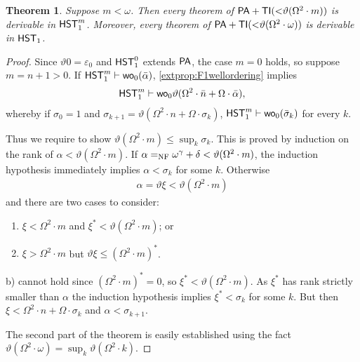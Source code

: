 \documentclass[UKenglish,cleveref,DIV=12]{scrartcl}
\newtheorem{theorem}{Theorem}
\newtheorem{corollary}[lemma]{Corollary}
\theoremstyle{definition}
\theoremstyle{definition}
\begin{document}
\begin{theorem}\label{extcor:F1lowerbound}\label{extthm:F1lowerbound}
Suppose $m<\omega$. Then every theorem of
$\mathsf{PA}+\mathsf{TI}(\mathord<\vartheta(\Omega^2\cdot m))$  is derivable in
$\mathsf{HST}_1^{m}$. Moreover, every theorem of
$\mathsf{PA}+\mathsf{TI}(\mathord<\vartheta(\Omega^2\cdot \omega))$ is derivable in
$\mathsf{HST}_1$.
\end{theorem}
\begin{proof}
Since $\vartheta0=\varepsilon_0$ and $\mathsf{HST}_1^0$ extends $\mathsf{PA}$, the case
$m=0$ holds, so suppose $m=n+1>0$. If $\mathsf{HST}_1^m\vdash \mathsf{wo}_0(\bar\alpha)$,
\cref{extprop:F1wellordering} implies
\begin{align*}
 \mathsf{HST}_1^{m}\vdash \mathsf{wo}_0 \vartheta(\Omega^2\cdot \bar n+\Omega\cdot\bar\alpha),
\end{align*}
whereby if $\sigma_0=1$ and $\sigma_{k+1}=\vartheta(\Omega^2\cdot n+\Omega\cdot\sigma_k)$, $\mathsf{HST}_1^m\vdash \mathsf{wo}_0(\bar\sigma_k)$ for every $k$.

Thus we require to show $\vartheta(\Omega^2\cdot m)\le\sup_k\sigma_k$. This
is proved by induction on the rank of $\alpha<\vartheta(\Omega^2\cdot
m)$. If $\alpha=_{\mathrm{NF}}\omega^\gamma+\delta<\vartheta(\Omega^2\cdot m)$, the induction
hypothesis immediately implies $\alpha<\sigma_k$ for some $k$. Otherwise
\begin{align*}
 \alpha=\vartheta\xi<\vartheta(\Omega^2\cdot m)
\end{align*}
and there are two cases to consider:
\begin{enumerate}%
 \item $\xi<\Omega^2\cdot m$ and $\xi^*<\vartheta(\Omega^2\cdot m)$; or
 \item $\xi>\Omega^2\cdot m$ but $\vartheta\xi\le(\Omega^2\cdot m)^*$.
\end{enumerate}
b) cannot hold since $(\Omega^2\cdot m)^*=0$, so $\xi^*<\vartheta(\Omega^2\cdot m)$. As $\xi^*$ has rank strictly
smaller than $\alpha$ the induction hypothesis
implies $\xi^*<\sigma_k$ for some $k$. But then $\xi<\Omega^2\cdot n+\Omega\cdot\sigma_k$ and
$\alpha<\sigma_{k+1}$.

The second part of the theorem is easily established using the fact $\vartheta(\Omega^2\cdot\omega)=\sup_k\vartheta(\Omega^2\cdot k)$.
\end{proof}
\end{document}
